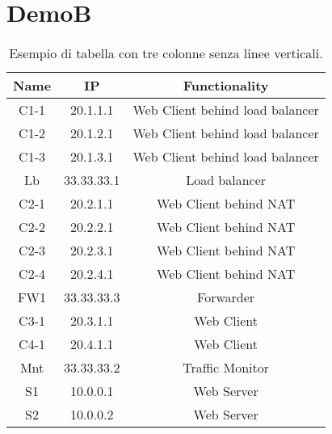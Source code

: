 \chapter{DemoB} \label{ch:DemoB}


\begin{table}
    \centering
    \begin{tabular}{ccc}
        \hline
         Name & IP & Functionality \\
        \hline
        C1-1 & 20.1.1.1 & Web Client behind load balancer \\
        C1-2 & 20.1.2.1 & Web Client behind load balancer \\
        C1-3 & 20.1.3.1 & Web Client behind load balancer \\
        Lb & 33.33.33.1 & Load balancer \\ 
        C2-1 & 20.2.1.1 & Web Client behind NAT \\
        C2-2 & 20.2.2.1 & Web Client behind NAT \\
        C2-3 & 20.2.3.1 & Web Client behind NAT \\
        C2-4 & 20.2.4.1 & Web Client behind NAT \\
        FW1 & 33.33.33.3 & Forwarder \\
        C3-1 & 20.3.1.1 & Web Client \\
        C4-1 & 20.4.1.1 & Web Client \\
        Mnt & 33.33.33.2 & Traffic Monitor \\
        S1 & 10.0.0.1 & Web Server \\
        S2 & 10.0.0.2 & Web Server \\
        \hline
    \end{tabular}
    \caption{Esempio di tabella con tre colonne senza linee verticali.}
    \label{tab:tabella}
\end{table}

